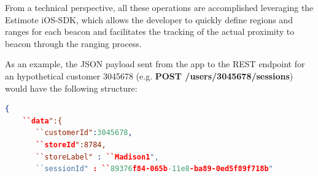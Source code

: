 From a technical perspective, all these operations are accomplished leveraging the Estimote iOS-SDK\cite{estimote-ios-sdk}, which allows the developer to quickly define regions and ranges for each beacon and facilitates the tracking of the actual proximity to beacon through the ranging process.

As an example, the JSON payload sent from the app to the REST endpoint for an hypothetical customer 3045678 (e.g. \textbf{POST /users/3045678/sessions}) would have the following structure:


\vspace{0.5cm}
\begin{lstlisting}[language=json,firstnumber=1]
  {
    ``data":{
       ``customerId":3045678,
       ``storeId":8784,
       ``storeLabel" : ``Madison1",
       ``sessionId" : ``89376f84-065b-11e8-ba89-0ed5f89f718b"


\end{lstlisting}
